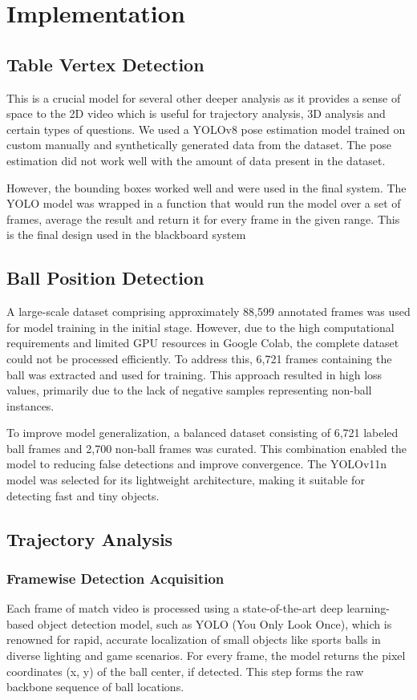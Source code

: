 \documentclass[conference]{IEEEtran}
\begin{document}
\section{Implementation}

\subsection{Table Vertex Detection}
This is a crucial model for several other deeper analysis as it provides a sense of space to the 2D video which is useful for trajectory analysis, 3D analysis and certain types of questions. We used a YOLOv8 pose estimation model trained on custom manually and synthetically generated data from the dataset. The pose estimation did not work well with the amount of data present in the dataset.

However, the bounding boxes worked well and were used in the final system. The YOLO model was wrapped in a function that would run the model over a set of frames, average the result and return it for every frame in the given range. This is the final design used in the blackboard system

\subsection{Ball Position Detection}
A large-scale dataset comprising approximately 88,599 annotated frames was used for model training in the initial stage. However, due to the high computational requirements and limited GPU resources in Google Colab, the complete dataset could not be processed efficiently. To address this, 6,721 frames containing the ball was extracted and used for training. This approach resulted in high loss values, primarily due to the lack of negative samples representing non-ball instances.

To improve model generalization, a balanced dataset consisting of 6,721 labeled ball frames and 2,700 non-ball frames was curated. This combination enabled the model to reducing false detections and improve convergence. The YOLOv11n model was selected for its lightweight architecture, making it suitable for detecting fast and tiny objects.

\subsection{Trajectory Analysis}

\subsubsection{Framewise Detection Acquisition}
Each frame of match video is processed using a state-of-the-art deep learning-based object detection model, such as YOLO (You Only Look Once), which is renowned for rapid, accurate localization of small objects like sports balls in diverse lighting and game scenarios. For every frame, the model returns the pixel coordinates (x, y) of the ball center, if detected. This step forms the raw backbone sequence of ball locations.
\end{document}
